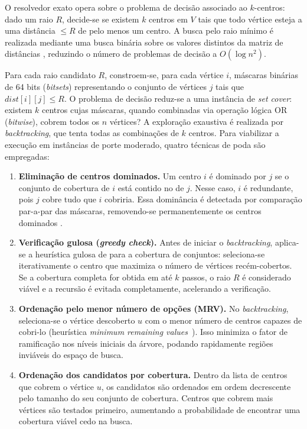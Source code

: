 \documentclass[12pt]{article}
\begin{document}
O resolvedor exato opera sobre o problema de decisão associado ao $k$-centros: dado um raio $R$, decide-se se existem $k$ centros em $V$ tais que todo vértice esteja a uma distância $\leq R$ de pelo menos um centro. A busca pelo raio mínimo é realizada mediante uma busca binária sobre os valores distintos da matriz de distâncias \cite{kariv1979}, reduzindo o número de problemas de decisão a $O(\log n^2)$.

Para cada raio candidato $R$, constroem-se, para cada vértice $i$, máscaras binárias de 64 bits (\textit{bitsets}) representando o conjunto de vértices $j$ tais que $dist[i][j] \leq R$. O problema de decisão reduz-se a uma instância de \textit{set cover}: existem $k$ centros cujas máscaras, quando combinadas via operação lógica OR (\textit{bitwise}), cobrem todos os $n$ vértices? A exploração exaustiva é realizada por \textit{backtracking}, que tenta todas as combinações de $k$ centros. Para viabilizar a execução em instâncias de porte moderado, quatro técnicas de poda são empregadas:

\begin{enumerate}
    \item \textbf{Eliminação de centros dominados.} Um centro $i$ é dominado por $j$ se o conjunto de cobertura de $i$ está contido no de $j$. Nesse caso, $i$ é redundante, pois $j$ cobre tudo que $i$ cobriria. Essa dominância é detectada por comparação par-a-par das máscaras, removendo-se permanentemente os centros dominados \cite{caruso2003}.

    \item \textbf{Verificação gulosa (\textit{greedy check}).} Antes de iniciar o \textit{backtracking}, aplica-se a heurística gulosa de \cite{chvatal1979} para a cobertura de conjuntos: seleciona-se iterativamente o centro que maximiza o número de vértices recém-cobertos. Se a cobertura completa for obtida em até $k$ passos, o raio $R$ é considerado viável e a recursão é evitada completamente, acelerando a verificação.

    \item \textbf{Ordenação pelo menor número de opções (MRV).} No \textit{backtracking}, seleciona-se o vértice descoberto $u$ com o menor número de centros capazes de cobri-lo (heurística \textit{minimum remaining values}~\cite{haralick1980}). Isso minimiza o fator de ramificação nos níveis iniciais da árvore, podando rapidamente regiões inviáveis do espaço de busca.

    \item \textbf{Ordenação dos candidatos por cobertura.} Dentro da lista de centros que cobrem o vértice $u$, os candidatos são ordenados em ordem decrescente pelo tamanho do seu conjunto de cobertura. Centros que cobrem mais vértices são testados primeiro, aumentando a probabilidade de encontrar uma cobertura viável cedo na busca.
\end{enumerate}
\end{document}
